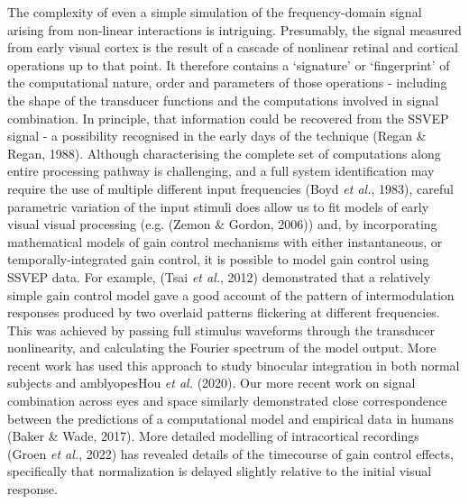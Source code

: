 \documentclass[
  letterpaper,
  DIV=11,
  numbers=noendperiod]{scrartcl}
\begin{document}
The complexity of even a simple simulation of the frequency-domain
signal arising from non-linear interactions is intriguing. Presumably,
the signal measured from early visual cortex is the result of a cascade
of nonlinear retinal and cortical operations up to that point. It
therefore contains a `signature' or `fingerprint' of the computational
nature, order and parameters of those operations - including the shape
of the transducer functions and the computations involved in signal
combination. In principle, that information could be recovered from the
SSVEP signal - a possibility recognised in the early days of the
technique (Regan \& Regan, 1988). Although characterising the complete
set of computations along entire processing pathway is challenging, and
a full system identification may require the use of multiple different
input frequencies (Boyd \emph{et al.}, 1983), careful parametric
variation of the input stimuli does allow us to fit models of early
visual visual processing (e.g. (Zemon \& Gordon, 2006)) and, by
incorporating mathematical models of gain control mechanisms with either
instantaneous, or temporally-integrated gain control, it is possible to
model gain control using SSVEP data. For example, (Tsai \emph{et al.},
2012) demonstrated that a relatively simple gain control model gave a
good account of the pattern of intermodulation responses produced by two
overlaid patterns flickering at different frequencies. This was achieved
by passing full stimulus waveforms through the transducer nonlinearity,
and calculating the Fourier spectrum of the model output. More recent
work has used this approach to study binocular integration in both
normal subjects and amblyopesHou \emph{et al.} (2020). Our more recent
work on signal combination across eyes and space similarly demonstrated
close correspondence between the predictions of a computational model
and empirical data in humans (Baker \& Wade, 2017). More detailed
modelling of intracortical recordings (Groen \emph{et al.}, 2022) has
revealed details of the timecourse of gain control effects, specifically
that normalization is delayed slightly relative to the initial visual
response.
\end{document}
